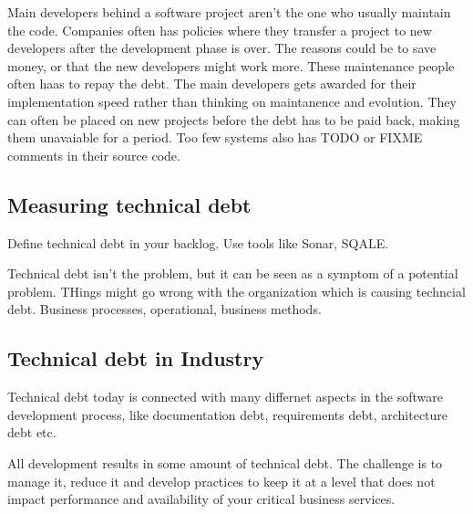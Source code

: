 Main developers behind a software project aren't the one who usually maintain the code. Companies often has policies where they transfer a project to new developers after the development phase is over. The reasons could be to save money, or that the new developers might work more. These maintenance people often haas to repay the debt. The main developers gets awarded for their implementation speed rather than thinking on maintanence and evolution. They can often be placed on new projects before the debt has to be paid back, making them unavaiable for a period. Too few systems also has TODO or FIXME comments in their source code.


\subsection{Measuring technical debt}
Define technical debt in your backlog.
Use tools like Sonar, SQALE.

Technical debt isn't the problem, but it can be seen as a symptom of a potential problem. THings might go wrong with the organization which is causing techncial debt. Business processes, operational, business methods. 


\subsection{Technical debt in Industry}
Technical debt today is connected with many differnet aspects in the software development process, like documentation debt, requirements debt, architecture debt etc\cite{Falessi:2015:FRI:2797433.2797462}. 

All development results in some amount of technical debt. The challenge is to manage it, reduce it and develop practices to keep it at a level that does not impact performance and availability of your critical business services.

